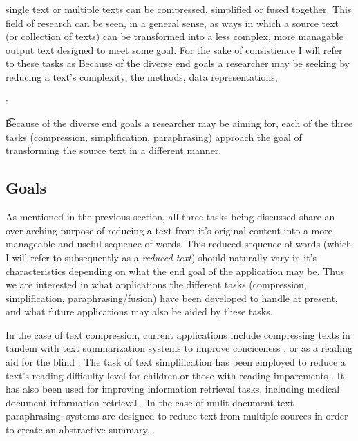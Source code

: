 {single text or multiple texts can be compressed, simplified or fused together.  This field of research can be seen, in a general sense, as ways in which a source text (or collection of texts) can be transformed into a less complex, more managable output text designed to meet some goal.  For the sake of consistience I will refer to these tasks as  Because of the diverse end goals a researcher may be seeking by reducing a text's complexity, the methods, data representations,} 





 :

\t{Because of the diverse end goals a researcher may be aiming for, each of the three tasks (compression, simplification, paraphrasing) approach the goal of transforming the source text in a different manner. 
}







\subsection{Goals}


{As mentioned in the previous section, all three tasks being discussed share an over-arching purpose of reducing a text from it's original content into a more manageable and useful sequence of words.  This reduced sequence of words (which I will refer to subsequently as a \textit{reduced text}) should naturally vary in it's characteristics depending on what the end goal of the application may be.  Thus we are interested in what applications the different tasks (compression, simplification, paraphrasing/fusion) have been developed to handle at present, and what future applications may also be aided by these tasks.

  In the case of text compression, current applications include compressing texts in tandem with text summarization systems to improve conciceness \citet{Jing2000}, or as a reading aid
for the blind \citet{Grefenstette1998}. The task of text simplification  has been employed to reduce a text's reading difficulty level for children\citet{bla}.or those with reading imparements \citet{bla}.  It has also been  used for improving information retrieval tasks, including medical document information retrieval \citet{bla}. In the case of mulit-document text paraphrasing,  systems are  designed to reduce text from multiple sources in order to create an abstractive summary.\citet{bla}.}

